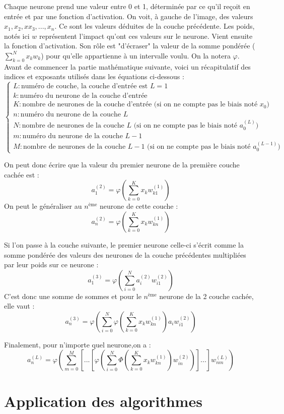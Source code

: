 	Chaque neurone prend une valeur entre 0 et 1, déterminée par ce qu'il reçoit en entrée et par une fonction d'activation. On voit, à gauche de l'image, des valeurs $x_1, x_2,x x_3, ..., x_n$. Ce sont les valeurs déduites de la couche précédente. Les poids, notés ici $w$ représentent l'impact qu'ont ces valeurs sur le neurone. Vient ensuite la fonction d'activation. Son rôle est "d'écraser" la valeur de la somme pondérée ($\sum_{k=0}^{N}x_kw_{k}$) pour qu'elle appartienne à un intervalle voulu. On la notera $\varphi$.\\
	
	Avant de commencer la partie mathématique suivante, voici un récapitulatif des indices et exposants utilisés dans les équations ci-dessous : \\
	$$
	\begin{cases}
		L : \text{numéro de couche, la couche d'entrée est $L = 1$}\\
		k : \text{numéro du neurone de la couche d'entrée}\\
		K : \text{nombre de neurones de la couche d'entrée (si on ne compte pas le biais noté $x_0$)}\\
		n : \text{numéro du neurone de la couche $L$}\\
		N : \text{nombre de neurones de la couche $L$ (si on ne compte pas le biais noté $a_0^{(L)}$)}\\
		m : \text{numéro du neurone de la couche $L-1$}\\
		M : \text{nombre de neurones de la couche $L-1$ (si on ne compte pas le biais noté $a_0^{(L-1)}$)}
	\end{cases}
	$$
	
	On peut donc écrire que la valeur du premier neurone de la première couche cachée est : 
	$$a_1^{(2)} = \varphi\left(\sum_{k=0}^{K}x_kw_{k1}^{(1)}\right)$$
	On peut le généraliser au $n^{\text{ème}}$ neurone de cette couche :
	$$a_n^{(2)} = \varphi\left(\sum_{k=0}^{K}x_kw_{kn}^{(1)}\right)$$
	
	\noindent Si l'on passe à la couche suivante, le premier neurone celle-ci s'écrit comme la somme pondérée des valeurs des neurones de la couche précédentes multipliées par leur poids sur ce neurone : 
	$$a_1^{(3)}  = \varphi\left(\sum_{i=0}^{N}a_i^{(2)}w_{i1}^{(2)}\right)$$
	C'est donc une somme de sommes et pour le $n^{\text{ème}}$ neurone de la 2\ieme{} couche cachée, elle vaut :
	$$a_n^{(3)} = \varphi\left(\sum_{i=0}^{N}\varphi\left(\sum_{k=0}^{K}x_kw_{kn}^{(1)}\right)a_i w_{i1}^{(2)}\right)$$
	
	\noindent Finalement, pour n'importe quel neurone,on a :
	$$ a_n^{(L)} = \varphi\left(\sum_{m=0}^{M}\left[...\left[\varphi\left(\sum_{i=0}^{N}\varPhi\left(\sum_{k=0}^{K}x_kw_{kn}^{(1)}\right)w_{in}^{(2)}\right)\right]...\right]w_{nm}^{(L)}\right) $$
	
	
\section{Application des algorithmes}